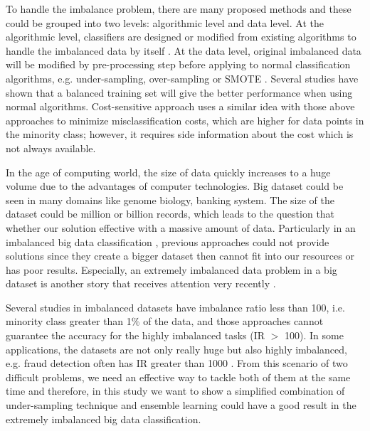 To handle the imbalance problem, there are many proposed methods and these could be grouped into two levels: algorithmic level and data level. At the algorithmic level, classifiers are designed or modified from existing algorithms to handle the imbalanced data by itself \cite{bradford1998pruning,cieslak2008learning}. At the data level, original imbalanced data will be modified by pre-processing step before applying to normal classification algorithms, e.g. under-sampling, over-sampling \cite{drummond2003c4} or SMOTE \cite{chawla2002smote}. Several studies \cite{weiss2001effect, laurikkala2001improving, estabrooks2004multiple} have shown that a balanced training set will give the better performance when using normal algorithms. Cost-sensitive approach \cite{ling2004decision} uses a similar idea with those above approaches to minimize misclassification costs, which are higher for data points in the minority class; however, it requires side information about the cost which is not always available.

In the age of computing world, the size of data quickly increases to a huge volume due to the advantages of computer technologies. Big dataset could be seen in many domains like genome biology, banking system. The size of the dataset could be million or billion records, which leads to the question that whether our solution effective with a massive amount of data. Particularly in an imbalanced big data classification \cite{del2014use, triguero2015evolutionary, fernandez2017insight}, previous approaches could not provide solutions since they create a bigger dataset then cannot fit into our resources or has poor results. Especially, an extremely imbalanced data problem in a big dataset is another story that receives attention very recently \cite{triguero2015rosefw, krawczyk2016learning}.

Several studies in imbalanced datasets have imbalance ratio less than 100, i.e. minority class greater than 1\% of the data, and those approaches cannot guarantee the accuracy for the highly imbalanced tasks (IR $>$ 100). In some applications, the datasets are not only really huge but also highly imbalanced, e.g. fraud detection often has IR greater than 1000 \cite{juszczak2008off}. From this scenario of two difficult problems, we need an effective way to tackle both of them at the same time and therefore, in this study we want to show a simplified combination of under-sampling technique and ensemble learning could have a good result in the extremely imbalanced big data classification.

